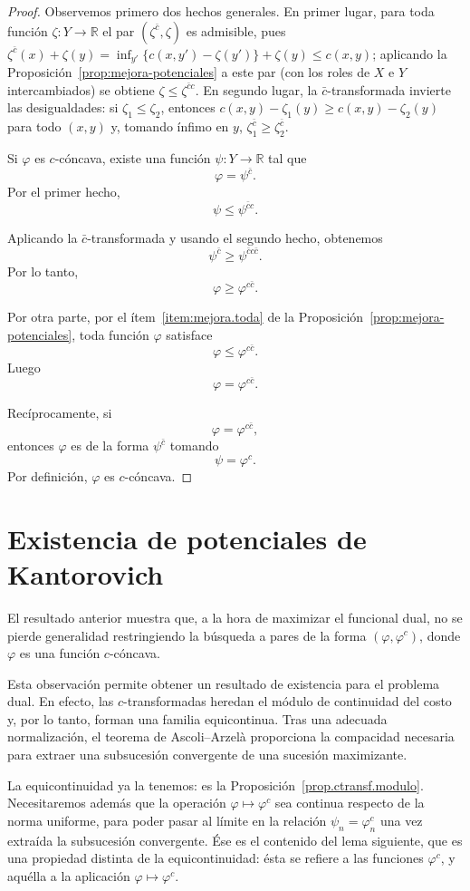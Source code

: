 \documentclass[12pt, a4paper]{amsbook}
\newcommand{\R}{{\mathbb R}}
\theoremstyle{remark}
\theoremstyle{definition}
\numberwithin{section}{chapter}
\numberwithin{subsection}{section}
\numberwithin{equation}{section}
\numberwithin{figure}{chapter}
\begin{document}
\begin{proof}
Observemos primero dos hechos generales. En primer lugar, para toda función
$\zeta\colon Y\to\R$ el par $(\zeta^{\bar c},\zeta)$ es admisible, pues
$\zeta^{\bar c}(x)+\zeta(y)=\inf_{y'}\{c(x,y')-\zeta(y')\}+\zeta(y)\le c(x,y)$;
aplicando la Proposición~\ref{prop:mejora-potenciales} a este par (con los
roles de $X$ e $Y$ intercambiados) se obtiene $\zeta\le\zeta^{\bar cc}$.
En segundo lugar, la $\bar c$-transformada invierte las desigualdades: si
$\zeta_1\le\zeta_2$, entonces $c(x,y)-\zeta_1(y)\ge c(x,y)-\zeta_2(y)$ para todo
$(x,y)$ y, tomando ínfimo en $y$, $\zeta_1^{\bar c}\ge\zeta_2^{\bar c}$.

Si $\varphi$ es $c$-cóncava, existe una función
$\psi\colon Y\to\R$ tal que
\[
\varphi=\psi^{\bar c}.
\]
Por el primer hecho,
\[
\psi\leq\psi^{\bar c c}.
\]

Aplicando la $\bar c$-transformada y usando el segundo hecho, obtenemos
\[
\psi^{\bar c}\geq\psi^{\bar c c\bar c}.
\]
Por lo tanto,
\[
\varphi\geq\varphi^{c\bar c}.
\]

Por otra parte, por el ítem~\ref{item:mejora.toda} de la
Proposición~\ref{prop:mejora-potenciales}, toda función $\varphi$ satisface
\[
\varphi\leq\varphi^{c\bar c}.
\]
Luego
\[
\varphi=\varphi^{c\bar c}.
\]

Recíprocamente, si
\[
\varphi=\varphi^{c\bar c},
\]
entonces $\varphi$ es de la forma $\psi^{\bar c}$ tomando
\[
\psi=\varphi^c.
\]
Por definición, $\varphi$ es $c$-cóncava.
\end{proof}

\section{Existencia de potenciales de Kantorovich}

El resultado anterior muestra que, a la hora de maximizar el funcional dual,
no se pierde generalidad restringiendo la búsqueda a pares de la forma
$(\varphi,\varphi^c)$, donde $\varphi$ es una función \(c\)-cóncava.

Esta observación permite obtener un resultado de existencia para el problema
dual. En efecto, las \(c\)-transformadas heredan el módulo de continuidad del
costo y, por lo tanto, forman una familia equicontinua. Tras una adecuada
normalización, el teorema de Ascoli--Arzelà proporciona la compacidad
necesaria para extraer una subsucesión convergente de una sucesión
maximizante.

La equicontinuidad ya la tenemos: es la
Proposición~\ref{prop.ctransf.modulo}. Necesitaremos además que la operación
$\varphi\mapsto\varphi^c$ sea continua respecto de la norma uniforme, para
poder pasar al límite en la relación $\psi_n=\varphi_n^c$ una vez extraída la
subsucesión convergente. Ése es el contenido del lema siguiente, que es una
propiedad distinta de la equicontinuidad: ésta se refiere a las funciones
$\varphi^c$, y aquélla a la aplicación $\varphi\mapsto\varphi^c$.
\end{document}
